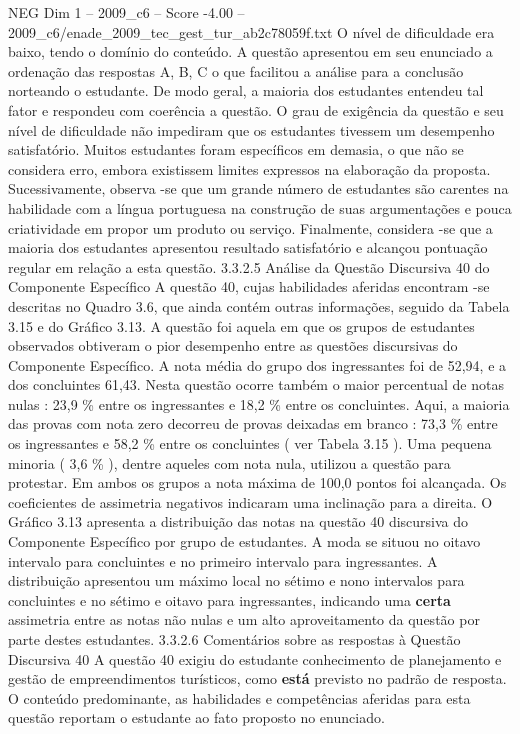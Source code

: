 \begin{textsample}{NEG Dim 1 – 2009\_c6 – Score -4.00 – 2009\_c6/enade\_2009\_tec\_gest\_tur\_ab2c78059f.txt}
O nível de dificuldade era baixo, tendo o domínio do conteúdo.
A questão apresentou em seu enunciado a ordenação das respostas A, B, C o que facilitou a análise para a conclusão norteando o estudante.
De modo geral, a maioria dos estudantes entendeu tal fator e respondeu com coerência a questão.
O grau de exigência da questão e seu nível de dificuldade não impediram que os estudantes tivessem um desempenho satisfatório.
Muitos estudantes foram específicos em demasia, o que não se considera erro, embora existissem limites expressos na elaboração da proposta.
Sucessivamente, observa -se que um grande número de estudantes são carentes na habilidade com a língua portuguesa na construção de suas argumentações e pouca criatividade em propor um produto ou serviço.
Finalmente, considera -se que a maioria dos estudantes apresentou resultado satisfatório e alcançou pontuação regular em relação a esta questão. 3.3.2.5 Análise da Questão Discursiva 40 do Componente Específico A questão 40, cujas habilidades aferidas encontram -se descritas no Quadro 3.6, que ainda contém outras informações, seguido da Tabela 3.15 e do Gráfico 3.13.
A questão foi aquela em que os grupos de estudantes observados obtiveram o pior desempenho entre as questões discursivas do Componente Específico.
A nota média do grupo dos ingressantes foi de 52,94, e a dos concluintes 61,43.
Nesta questão ocorre também o maior percentual de notas nulas : 23,9 \% entre os ingressantes e 18,2 \% entre os concluintes.
Aqui, a maioria das provas com nota zero decorreu de provas deixadas em branco : 73,3 \% entre os ingressantes e 58,2 \% entre os concluintes ( ver Tabela 3.15 ).
Uma pequena minoria ( 3,6 \% ), dentre aqueles com nota nula, utilizou a questão para protestar.
Em ambos os grupos a nota máxima de 100,0 pontos foi alcançada.
Os coeficientes de assimetria negativos indicaram uma inclinação para a direita.
O Gráfico 3.13 apresenta a distribuição das notas na questão 40 discursiva do Componente Específico por grupo de estudantes.
A moda se situou no oitavo intervalo para concluintes e no primeiro intervalo para ingressantes.
A distribuição apresentou um máximo local no sétimo e nono intervalos para concluintes e no sétimo e oitavo para ingressantes, indicando uma \textbf{certa} assimetria entre as notas não nulas e um alto aproveitamento da questão por parte destes estudantes. 3.3.2.6 Comentários sobre as respostas à Questão Discursiva 40 A questão 40 exigiu do estudante conhecimento de planejamento e gestão de empreendimentos turísticos, como \textbf{está} previsto no padrão de resposta.
O conteúdo predominante, as habilidades e competências aferidas para esta questão reportam o estudante ao fato proposto no enunciado.

\end{textsample}
